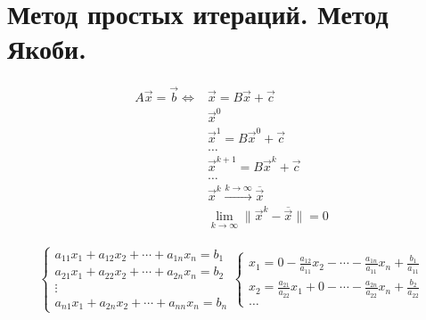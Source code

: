 \section{Метод простых итераций. Метод Якоби.}

\begin{align*}
  A \vec{x} = \vec{b} \iff &\vec{x} = B\vec{x} + \vec{c}\\
                           &\vec{x}^0\\
                           &\vec{x}^1 = B\vec{x}^0 + \vec{c} \\
                           &\dots\\
                           &\vec{x}^{k + 1}= B\vec{x}^k + \vec{c}\\
                           &\dots\\
                           &\vec{x}^k \xrightarrow{k \to \infty} \overline{\vec{x}}\\
                           &\lim_{k \to \infty} \|\vec{x}^k - \overline{\vec{x}}\| = 0
\end{align*}


\begin{gather*}
  \begin{cases}
    a_{11} x_1 + a_{12} x_2 + \cdots + a_{1n} x_n = b_1\\
    a_{21} x_1 + a_{22} x_2 + \cdots + a_{2n} x_n = b_2 \\
    \vdots \\
    a_{n1} x_1 + a_{2n} x_2 + \cdots + a_{nn} x_n = b_n
  \end{cases} 

  \begin{cases}
    x_1 = 0 - \frac{a_{12}}{a_{11}} x_2 - \cdots - \frac{a_{1n}}{a_{11}} x_n +
    \frac{b_1}{a_{11}} \\
    x_2 = \frac{a_{21}}{a_{22}} x_1 + 0 - \cdots - \frac{a_{2n}}{a_{22}} x_n +
    \frac{b_2}{a_{22}}\\
    \dots
  \end{cases}

\end{gather*}


